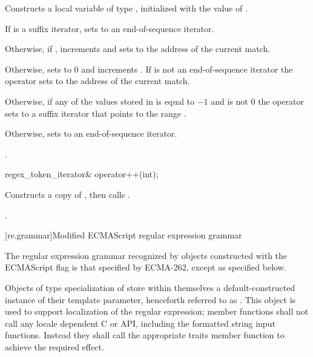 \begin{itemdescr}
\pnum
\effects
Constructs a local variable  of
type , initialized with the value
of .

\pnum
If  is a suffix iterator, sets  to an
end-of-sequence iterator.

\pnum
Otherwise, if , increments  and
sets  to the address of the current match.

\pnum
Otherwise, sets  to 0 and
increments . If  is not an
end-of-sequence iterator the operator sets  to the
address of the current match.

\pnum
Otherwise, if any of the values stored in  is equal to $-1$ and
 is not 0 the operator sets  to a
suffix iterator that points to the range .

\pnum
Otherwise, sets  to an end-of-sequence iterator.

\pnum
\returns
{}.
\end{itemdescr}

%
\begin{itemdecl}
regex_token_iterator& operator++(int);
\end{itemdecl}

\begin{itemdescr}
\pnum
\effects
Constructs a copy  of , then calls .

\pnum
\returns
{}.
\end{itemdescr}

[re.grammar]{Modified ECMAScript regular expression grammar}
%
%

\pnum
{}%
%
The regular expression grammar recognized by
 objects constructed with the ECMAScript
flag is that specified by ECMA-262, except as specified below.

\pnum
{}%
%
Objects of type specialization of  store within themselves a
default-constructed instance of their  template parameter, henceforth
referred to as . This  object is used to support localization
of the regular expression;  member functions shall not call
any locale dependent C or \Cpp{} API, including the formatted string input functions.
Instead they shall call the appropriate traits member function to achieve the required effect.


